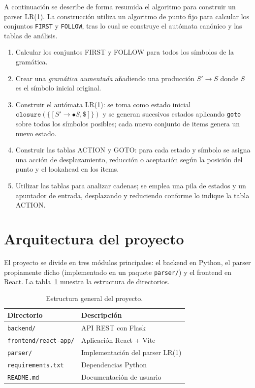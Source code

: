 \documentclass[12pt,a4paper]{article}
\begin{document}
A continuación se describe de forma resumida el algoritmo para construir un parser LR(1).  La construcción utiliza un algoritmo de punto fijo para calcular los conjuntos \texttt{FIRST} y \texttt{FOLLOW}, tras lo cual se construye el autómata canónico y las tablas de análisis.

\begin{enumerate}
  \item Calcular los conjuntos FIRST y FOLLOW para todos los símbolos de la gramática.
  \item Crear una \emph{gramática aumentada} añadiendo una producción $S' \to S$ donde $S$ es el símbolo inicial original.
  \item Construir el autómata LR(1): se toma como estado inicial $\texttt{closure}(\{[S' \to \bullet S, \$]\})$ y se generan sucesivos estados aplicando \texttt{goto} sobre todos los símbolos posibles; cada nuevo conjunto de items genera un nuevo estado.
  \item Construir las tablas ACTION y GOTO: para cada estado y símbolo se asigna una acción de desplazamiento, reducción o aceptación según la posición del punto y el lookahead en los items.
  \item Utilizar las tablas para analizar cadenas; se emplea una pila de estados y un apuntador de entrada, desplazando y reduciendo conforme lo indique la tabla ACTION.
\end{enumerate}

\section{Arquitectura del proyecto}

El proyecto se divide en tres módulos principales: el backend en Python, el parser propiamente dicho (implementado en un paquete \texttt{parser/}) y el frontend en React.  La tabla~\ref{tab:estructura} muestra la estructura de directorios.

\begin{table}[h]
\centering
\begin{tabular}{ll}
\toprule
\textbf{Directorio} & \textbf{Descripción} \\
\midrule
\texttt{backend/} & API REST con Flask\\
\texttt{frontend/react-app/} & Aplicación React + Vite\\
\texttt{parser/} & Implementación del parser LR(1)\\
\texttt{requirements.txt} & Dependencias Python\\
\texttt{README.md} & Documentación de usuario\\
\bottomrule
\end{tabular}
\caption{Estructura general del proyecto.}
\label{tab:estructura}
\end{table}
\end{document}
